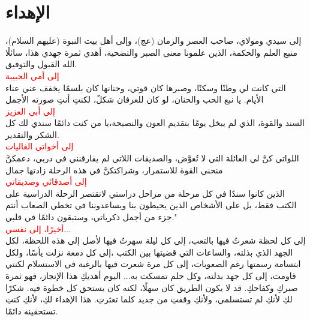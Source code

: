 \chapter*{الإهداء}
\begin{center}
	
إلى سيدي ومولاي، صاحب العصر والزمان (عج)، وإلى أهل بيت النبوة (عليهم السلام)، منبع العلم والحكمة، الذين علمونا معنى الصبر والتضحية، أهدي ثمرة جهدي هذا، سائلًا الله القبول والتوفيق.\\ [10pt]
\textcolor{red}{إلى أمي الحبيبة}\\
التي كانت لي وطنًا وسكنًا،  وصبرها كان قوتي، وحنانها كان بلسمًا يخفف عني عناء الأيام. يا نبع الحب والحنان، لو كان للعرفان شكلٌ، لكنتِ أنتِ صورته الأجمل\\[10pt]
\textcolor{red}{إلى أبي العزيز}\\
 السند والقوة، الذي لم يبخل يومًا بتقديم العون والنصيحة،يا من كنت دائمًا سندي لك كل الشكر والتقدير.\\[10pt]
\textcolor{red}{إلى أخواتي الغاليات}\\
اللواتي كنَّ لي العائلة التي لا تُعوَّض، والصديقات اللاتي لم يفارقنني في دربي، دعمكنَّ منحني القوة للاستمرار، وشراكتكنَّ في هذه الرحلة زادتها جمال\\[10pt]
\textcolor{red}{إلى أصدقائي وصديقاتي}\\
 الذين كانوا سندًا في كل مرحلة من مراحل دراستي لاتقتصر الرحلة الدراسية على الكتب فقط، بل على الأشخاص الذين يحيطون بنا ويساعدوننا في تخطي الصعاب أنتم جزء من أجمل ذكرياتي، وستبقون دائمًا في قلبي."\\[10pt]
\textcolor{red}{أخيرًا، إلى نفسي...}\\
إلى كل لحظة شعرتُ فيها بالتعب، إلى كل ليلة سهرتُ فيها لأصل إلى هذه اللحظة، لكل الجهد الذي بذلته، والساعات التي قضيتها بين الكتب ،إلى كل دمعة نزلت يأسًا، ولكل ابتسامة رسمتها رغم الصعوبات، إلى كل مرة شعرت فيها بالرغبة في الاستسلام لكنني قاومت، إلى كل جهد بذلته، وكل حلم تمسكت به... اليوم أهديكِ هذا الإنجاز، فهو ثمرة صبركِ وكفاحكِ. قد لا يكون الطريق كان سهلًا، لكنه كان يستحق كل خطوة فيه. شكرًا لكِ لأنكِ لم تستسلمي، ولأنكِ وقفتِ من جديد كلما تعثرتِ. هذا الإهداء لكِ، لأنكِ كنتِ تستحقينه دائمًا.
\end{center}
